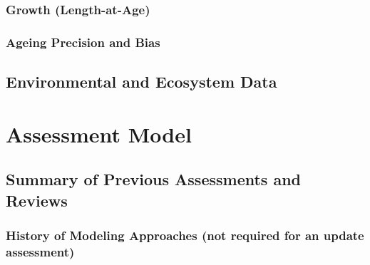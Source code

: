 \documentclass[11pt,
  english,
  a4paper,
]{article}
\begin{document}
\leavevmode\tagmcend\tagstructend


\hypertarget{growth-length-at-age}{%
\subsubsection{Growth (Length-at-Age)}\label{growth-length-at-age}}

\leavevmode\tagmcend\tagstructend


\hypertarget{ageing-precision-and-bias}{%
\subsubsection{Ageing Precision and Bias}\label{ageing-precision-and-bias}}

\leavevmode\tagmcend\tagstructend


\hypertarget{environmental-and-ecosystem-data}{%
\subsection{Environmental and Ecosystem Data}\label{environmental-and-ecosystem-data}}

\leavevmode\tagmcend\tagstructend


\hypertarget{assessment-model}{%
\section{Assessment Model}\label{assessment-model}}

\leavevmode\tagmcend\tagstructend


\hypertarget{summary-of-previous-assessments-and-reviews}{%
\subsection{Summary of Previous Assessments and Reviews}\label{summary-of-previous-assessments-and-reviews}}

\leavevmode\tagmcend\tagstructend


\hypertarget{history-of-modeling-approaches-not-required-for-an-update-assessment}{%
\subsubsection{History of Modeling Approaches (not required for an update assessment)}\label{history-of-modeling-approaches-not-required-for-an-update-assessment}}
\end{document}
